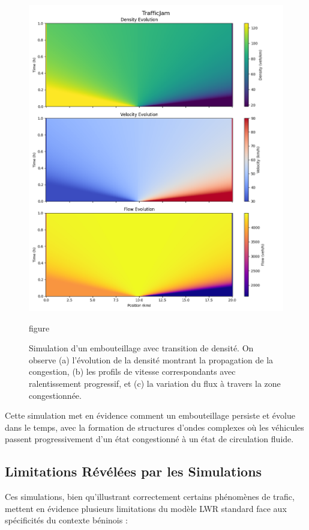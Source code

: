 \begin{figure}[htbp]
\centering
\includegraphics[width=1.0\textwidth]{simulations/LWR/trafficjam/trafficjam.png}
\caption{Simulation d'un embouteillage avec transition de densité. On observe (a) l'évolution de la densité montrant la propagation de la congestion, (b) les profils de vitesse correspondants avec ralentissement progressif, et (c) la variation du flux à travers la zone congestionnée.}
\label{fig:sim_trafficjam}{figure}
\end{figure}
Cette simulation met en évidence comment un embouteillage persiste et évolue dans le temps, avec la formation de structures d'ondes complexes où les véhicules passent progressivement d'un état congestionné à un état de circulation fluide.

\subsection{Limitations Révélées par les Simulations}
\label{subsec:limitations_sim}
Ces simulations, bien qu'illustrant correctement certains phénomènes de trafic, mettent en évidence plusieurs limitations du modèle LWR standard face aux spécificités du contexte béninois :

